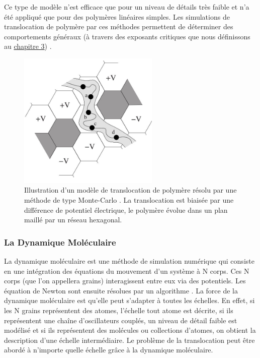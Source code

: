 Ce type de modèle n'est efficace que pour un niveau de détails très faible et n'a été appliqué que pour des polymères linéaires simples. Les simulations de translocation de polymère par ces méthodes permettent de déterminer des comportements généraux (à travers des exposants critiques que nous définissons au \hyperref[taubiased]{chapitre 3}) \cite{Milchev2004,Kantor2004,2Luo2006,Tsuchiya2007,Dubbeldam2007}.



\begin{figure}[H]
\begin{center}
\includegraphics[width=0.6\textwidth]{montecarlotransloc.jpg}

\caption[Simulations de type Monte-Carlo]{Illustration d'un modèle de translocation de polymère résolu par une méthode de type Monte-Carlo \cite{these}. La translocation est biaisée par une différence de potentiel électrique, le polymère évolue dans un plan maillé par un réseau hexagonal.}
\label{montecarlotransloc}
\end{center}
\end{figure}





\subsubsection*{La Dynamique Moléculaire}

La dynamique moléculaire est une méthode de simulation numérique qui consiste en une intégration des équations du mouvement d'un système à N corps. Ces N corps (que l'on appellera grains) interagissent entre eux via des potentiels. Les équation de Newton sont ensuite résolues par un algorithme \cite{Verlet1967}. La force de la dynamique moléculaire est qu'elle peut s'adapter à toutes les échelles. En effet, si les N grains représentent des atomes, l'échelle tout atome est décrite, si ils représentent une chaîne d'oscillateurs couplés, un niveau de détail faible est modélisé et si ils représentent des molécules ou collections d'atomes, on obtient la description d'une échelle intermédiaire. Le problème de la translocation peut être abordé à n'importe quelle échelle grâce à la dynamique moléculaire.\\

